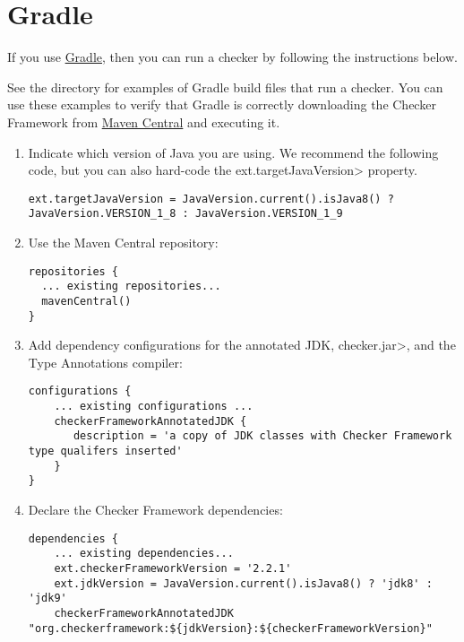 \section{Gradle\label{gradle}}

If you use \href{https://gradle.org/}{Gradle},
then you can run a checker by following the instructions below.

See the directory  for examples of Gradle
build files that run a checker.  You can use these examples to verify that
Gradle is correctly downloading the Checker Framework from
\href{http://search.maven.org/#search\%7Cga\%7C1\%7Corg.checkerframework}{Maven
  Central} and executing it.

\begin{enumerate}

\item Indicate which version of Java you are using.  We recommend the
  following code, but you can also hard-code the \<ext.targetJavaVersion>
  property.

\begin{mysmall}
\begin{Verbatim}
ext.targetJavaVersion = JavaVersion.current().isJava8() ? JavaVersion.VERSION_1_8 : JavaVersion.VERSION_1_9
\end{Verbatim}
\end{mysmall}

\item Use the Maven Central repository:

\begin{Verbatim}
repositories {
  ... existing repositories...
  mavenCentral()
}
\end{Verbatim}

\item Add dependency configurations for the annotated JDK, \<checker.jar>, and the Type Annotations compiler:

\begin{mysmall}
\begin{Verbatim}
configurations {
    ... existing configurations ...
    checkerFrameworkAnnotatedJDK {
       description = 'a copy of JDK classes with Checker Framework type qualifers inserted'
    }
}
\end{Verbatim}
\end{mysmall}

\item Declare the Checker Framework dependencies:

\begin{Verbatim}
dependencies {
    ... existing dependencies...
    ext.checkerFrameworkVersion = '2.2.1'
    ext.jdkVersion = JavaVersion.current().isJava8() ? 'jdk8' : 'jdk9'
    checkerFrameworkAnnotatedJDK "org.checkerframework:${jdkVersion}:${checkerFrameworkVersion}"


\end{Verbatim}
\end{enumerate}
